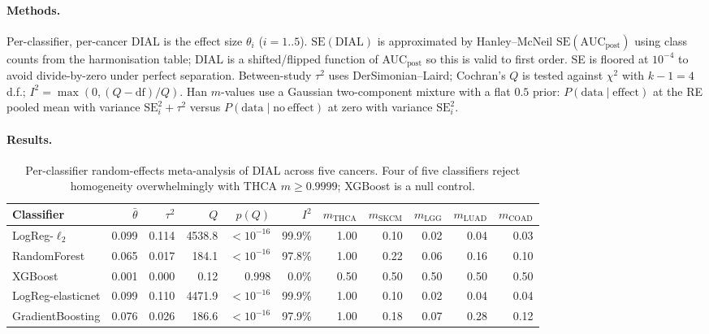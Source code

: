\documentclass[11pt,a4paper]{article}
\begin{document}
\paragraph{Methods.} Per-classifier, per-cancer DIAL is the effect
size $\theta_i$ ($i = 1..5$). $\mathrm{SE}(\mathrm{DIAL})$ is
approximated by Hanley--McNeil $\mathrm{SE}(\mathrm{AUC}_{\mathrm{post}})$
using class counts from the harmonisation table; DIAL is a
shifted/flipped function of AUC$_{\mathrm{post}}$ so this is valid to
first order. SE is floored at $10^{-4}$ to avoid divide-by-zero under
perfect separation. Between-study $\tau^2$ uses DerSimonian--Laird;
Cochran's $Q$ is tested against $\chi^2$ with $k - 1 = 4$ d.f.;
$I^2 = \max(0, (Q - \mathrm{df})/Q)$. Han $m$-values
\citep{han2012mvalue} use a Gaussian two-component mixture with a
flat $0.5$ prior: $P(\mathrm{data} \mid \mathrm{effect})$ at the RE
pooled mean with variance $\mathrm{SE}_i^2 + \tau^2$ versus
$P(\mathrm{data} \mid \mathrm{no\ effect})$ at zero with variance
$\mathrm{SE}_i^2$.

\paragraph{Results.}
\begin{table}[htbp]
\centering
\small
\begin{tabular}{lrrrrrrrrrr}\toprule
Classifier & $\bar\theta$ & $\tau^2$ & $Q$ & $p(Q)$ & $I^2$ &
$m_{\mathrm{THCA}}$ & $m_{\mathrm{SKCM}}$ & $m_{\mathrm{LGG}}$ &
$m_{\mathrm{LUAD}}$ & $m_{\mathrm{COAD}}$ \\ \midrule
LogReg-$\ell_2$      & 0.099 & 0.114 & 4538.8 & $<10^{-16}$ & 99.9\% &
1.00 & 0.10 & 0.02 & 0.04 & 0.03 \\
RandomForest         & 0.065 & 0.017 & 184.1 & $<10^{-16}$ & 97.8\% &
1.00 & 0.22 & 0.06 & 0.16 & 0.10 \\
XGBoost              & 0.001 & 0.000 & 0.12  & 0.998       & 0.0\%  &
0.50 & 0.50 & 0.50 & 0.50 & 0.50 \\
LogReg-elasticnet    & 0.099 & 0.110 & 4471.9 & $<10^{-16}$ & 99.9\% &
1.00 & 0.10 & 0.02 & 0.04 & 0.04 \\
GradientBoosting     & 0.076 & 0.026 & 186.6 & $<10^{-16}$ & 97.9\% &
1.00 & 0.18 & 0.07 & 0.28 & 0.12 \\
\bottomrule\end{tabular}
\caption{Per-classifier random-effects meta-analysis of DIAL across
five cancers. Four of five classifiers reject homogeneity
overwhelmingly with THCA $m \geq 0.9999$; XGBoost is a null control.}
\label{tab:s3}
\end{table}
\end{document}
